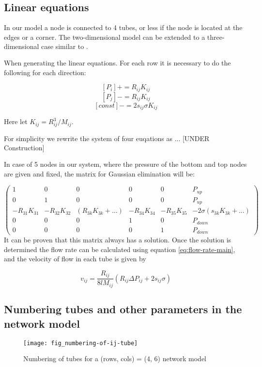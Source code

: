 \subsection{Linear equations}
	In our model a node is connected to 4 tubes, or less if the node is located at the edges or a corner. The two-dimensional model can be extended to a three-dimensional case similar to \cite{sinha2017effective}.
	
	When generating the linear equations. For each row it is necessary to do the following for each direction:
	
	\[ [P_i] += R_{ij}K_{ij} \]
	\[ [P_j] -= R_{ij}K_{ij} \]
	\[ [const] -= 2s_{ij}\sigma K_{ij} \]
	
	Here let $K_{ij} = R^3_{ij}/{M}_{ij}$.

	For simplicity we rewrite the system of four euqations as ... [UNDER Construction]
	
	
	In case of 5 nodes in our system, where the pressure of the bottom and top nodes are given and fixed, the matrix for Gaussian elimination will be:

	\[ 
	\begin{pmatrix}
		1 & 0 & 0 & 0 & 0 & P_{up}\\
		0 & 1 & 0 & 0 & 0 & P_{up}\\
		-R_{31}K_{31} & -R_{32}K_{32} & (R_{3k}K_{3k} + ...) & -R_{34}K_{34} & -R_{35}K_{35} & -2\sigma(s_{3k}K_{3k} + ...)\\
		0 & 0 & 0 & 1 & 0 & P_{down}\\
		0 & 0 & 0 & 0 & 1 & P_{down}
	\end{pmatrix}
	\]
	 It can be proven that this matrix always has a solution. Once the solution is determined the flow rate can be calculated using equation \ref{eq:flow-rate-main}, and the velocity of flow in each tube is given by
	 
	\begin{equation} \label{eq:velocity-in-tube}
		\boxed{v_{ij} = \frac{R_{ij}}{8lM_{ij}}(R_{ij}\Delta P_{ij} + 2s_{ij}\sigma)}
	\end{equation}
	
	
\subsection{Numbering tubes and other parameters in the network model}

	\begin{figure}[H]
		\texttt{[image: fig\_numbering-of-ij-tube]}
		\caption{Numbering of tubes for a (rows, cols) = (4, 6) network model}
		\label{fig_numbering-of-ij-tube}
	\end{figure}
	
